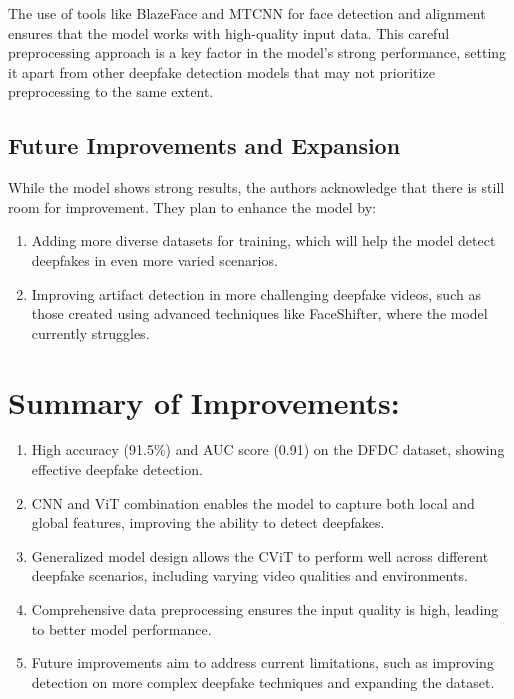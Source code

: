 \documentclass{report}
\begin{document}
	
	The use of tools like BlazeFace and MTCNN for face detection and alignment ensures that the model works with high-quality input data. This careful preprocessing approach is a key factor in the model’s strong performance, setting it apart from other deepfake detection models that may not prioritize preprocessing to the same extent.
	
	
	
	
	\subsection{Future Improvements and Expansion}
	While the model shows strong results, the authors acknowledge that there is still room for improvement. They plan to enhance the model by:
	
	\begin{enumerate}
		\item 
		Adding more diverse datasets for training, which will help the model detect deepfakes in even more varied scenarios.
		
		\item 
		Improving artifact detection in more challenging deepfake videos, such as those created using advanced techniques like FaceShifter, where the model currently struggles.
	\end{enumerate}
	
	
	
	\section{Summary of Improvements:}
	\begin{enumerate}
		\item 
		High accuracy (91.5\%) and AUC score (0.91) on the DFDC dataset, showing effective deepfake detection.
		
		\item 
		CNN and ViT combination enables the model to capture both local and global features, improving the ability to detect deepfakes.
		
		\item 
		Generalized model design allows the CViT to perform well across different deepfake scenarios, including varying video qualities and environments.
		
		\item 
		Comprehensive data preprocessing ensures the input quality is high, leading to better model performance.
		
		\item 
		Future improvements aim to address current limitations, such as improving detection on more complex deepfake techniques and expanding the dataset.
	\end{enumerate}
	
	
	
	
	
	
	
	
	
	
	
	
	
	
	
	
	
	
	
	
	
	
	
	
	
	
	
	
	
	
	
	\newpage
	
	
	
\end{document}

